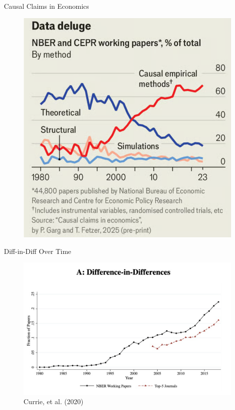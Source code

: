 \documentclass{beamer}
\begin{document}
\begin{frame}{Causal Claims in Economics}

	\begin{figure}
	\includegraphics[scale=0.4]{./lecture_includes/causal_claims}
	\end{figure}

\end{frame}


\begin{frame}{Diff-in-Diff Over Time}

	\begin{figure}
	\caption{Currie, et al. (2020)}
	\includegraphics[scale=0.25]{./lecture_includes/currie_did.png}
	\end{figure}

\end{frame}
\end{document}
